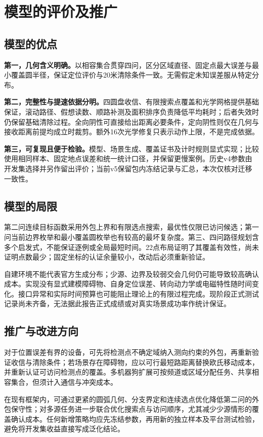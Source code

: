 \section{模型的评价及推广}\label{sec:7}
\subsection{模型的优点}
\textbf{第一，几何含义明确。}以相容集合贯穿四问，区分区域直径、固定点最大误差与最小覆盖圆半径，保证定位评价与20米清除条件一致。无需假定未知误差服从特定分布。

\textbf{第二，完整性与提速依据分明。}四圆盘收信、有限搜索点覆盖和光学网格提供基础保证，滚动路径、假想读数、顺路补测及面积排序负责降低平均耗时；后者失效时仍保留基础清除过程。全向阴性可直接给出距离必要条件，定向阴性则仅在几何与接收距离前提均成立时裁剪。额外16次光学修复只表示动作上限，不是完成依据。

\textbf{第三，可复现且便于检验。}模型、场景生成、覆盖证书及计时规则显式实现；比较使用相同样本、固定地点误差和统一统计口径，并保留更慢案例。历史v4参数由开发集选择并另作留出评价；当前v5保留包内冻结记录与汇总，本次仅核对迁移一致性。

\subsection{模型的局限}
第二问连续目标函数采用外包上界和有限选点搜索，最优性仅限已访问候选；第一问当前边界枚举和最小覆盖圆枚举也有较高的最坏复杂度。第三、四问路径规划含多个启发式，不能保证逐例或全局最短时间。22点布局证明了其覆盖有效性，尚未证明点数最少；固定坐标的认证余量较小，改动后必须重新验证。

自建环境不能代表官方生成分布；少源、边界及较弱交会几何仍可能导致较高确认成本。实现没有显式建模障碍物、自身定位误差、转向动力学或电磁特性随时间变化。接口异常和实际时间预算也可能阻止理论上的有限过程完成。现阶段正式测试记录尚未齐备，无法据此报告正式成绩或对真实场景成功率作统计保证。

\subsection{推广与改进方向}
对于位置误差有界的设备，可先将检测点不确定域纳入测向约束的外包，再重新验证收信与清除条件；若场景存在障碍物，应以可行最短路距离替换欧氏移动成本，并重新认证可访问检测点的覆盖。多机器狗扩展可按频道或区域分配任务、共享相容集合，但须计入通信与冲突成本。

在现有框架内，可通过更紧的圆弧几何、分支界定和连续选点优化降低第二问的外包保守性；对多源任务进一步联合优化搜索点与访问顺序，尤其减少少源情形的覆盖确认成本。任何新增策略均应先冻结参数，再用新的独立样本及平台测试检验，避免将开发集收益直接写成泛化结论。

